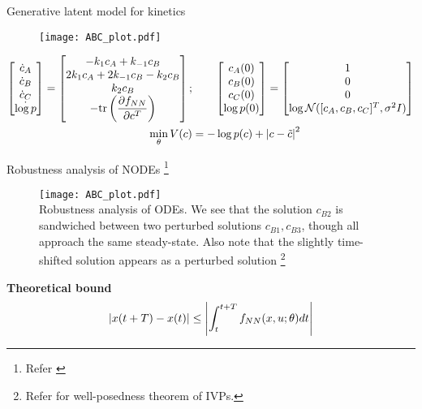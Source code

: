 \documentclass[dvipsnames, 9pt]{beamer}
\begin{document}
\begin{frame}{Generative latent model for kinetics}
    \begin{figure}
        \centering
        \texttt{[image: ABC\_plot.pdf]}\\
    \end{figure}
    \begin{align*}
        \begin{bmatrix} \dot{c}_A \\ \dot{c}_B \\ \dot{c}_C \\ \dot{\log p} \end{bmatrix}
        = \begin{bmatrix}
            -k_{1}c_A + k_{-1}c_B  \\
            2k_{1}c_A +  2k_{-1}c_B - k_2c_B \\
            k_{2}c_B\\
            -\mathrm{tr} \left(\dfrac{\partial f_{NN}}{\partial c^T}\right)
        \end{bmatrix};
        &\qquad
        \begin{bmatrix} c_A(0) \\ c_B(0) \\ c_C(0) \\ \log p(0) \end{bmatrix} =
        \begin{bmatrix} 1 \\ 0 \\ 0 \\ \log{\mathcal{N}([c_A, c_B, c_C]^T, \sigma^2I)} \end{bmatrix} \notag \\
        \min\limits_{\theta} V(c) &= -\log p(c) + \left| c - \tilde{c} \right|^2
    \end{align*}
\end{frame}

\begin{frame}{Robustness analysis of NODEs \footnote{Refer \cite{yan:du:tan:feng:2019}}}
    \begin{figure}[h]
        \centering
        \texttt{[image: ABC\_plot.pdf]} \\
        Robustness analysis of ODEs. We see that the solution $c_{B2}$ 
        is sandwiched between two perturbed solutions $c_{B1}, c_{B3}$, 
        though all approach the same steady-state. Also note that the slightly time-shifted
        solution appears as a perturbed solution \footnote{Refer \cite{ascher:petzold:1998}
        for well-posedness theorem of IVPs.}
        \label{fig:robust}
    \end{figure}
    \center \textbf{Theoretical bound}
    \begin{align*}
        \left| x(t+T)-x(t) \right| \leq \left| \int_t^{t+T} f_{NN}(x, u; \theta) dt \right|
    \end{align*} 
\end{frame}
\end{document}
